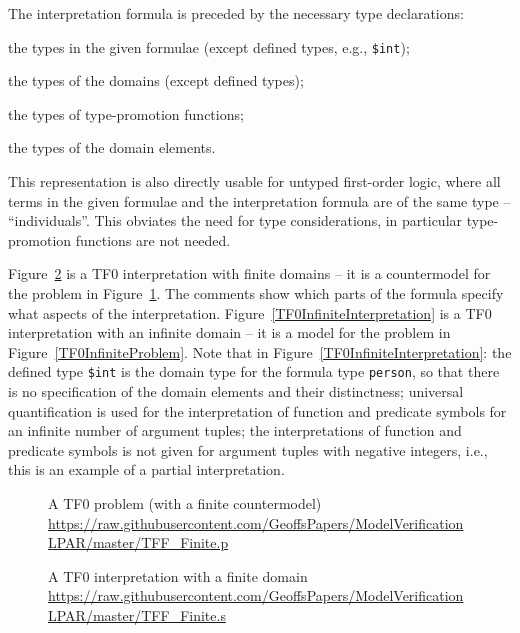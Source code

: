 \documentclass{easychair}
\newcommand{\smalltt}[1]{\small \texttt{#1}}
\newenvironment{packed_itemize}{
\vspace*{-0.2em}
\begin{itemize}
\setlength{\partopsep}{0pt}
\setlength{\itemsep}{1pt}
\setlength{\parskip}{0pt}
\setlength{\parsep}{0pt}
}{\end{itemize}}
\begin{document}
The interpretation formula is preceded by the necessary type declarations:
\begin{packed_itemize}
\item the types in the given formulae (except defined types, e.g., {\smalltt{\$int}});
\item the types of the domains (except defined types);
\item the types of type-promotion functions;
\item the types of the domain elements.
\end{packed_itemize}
This representation is also directly usable for untyped first-order logic, where all terms in 
the given formulae and the interpretation formula are of the same type – ``individuals''. 
This obviates the need for type considerations, in particular type-promotion functions are not 
needed.

Figure~\ref{TF0FiniteInterpretation} is a TF0 interpretation with finite domains -- it is a 
countermodel for the problem in Figure~\ref{TF0FiniteProblem}.
The comments show which parts of the formula specify what aspects of the interpretation.
Figure~\ref{TF0InfiniteInterpretation} is a TF0 interpretation with an infinite domain -- it 
is a model for the problem in Figure~\ref{TF0InfiniteProblem}.
Note that in Figure~\ref{TF0InfiniteInterpretation}:
the defined type {\smalltt{\$int}} is the domain type for the formula type 
{\smalltt{person}}, so that there is no specification of the domain elements and their 
distinctness;
universal quantification is used for the interpretation of function and predicate
symbols for an infinite number of argument tuples;
the interpretations of function and predicate symbols is not given for argument 
tuples with negative integers, i.e., this is an example of a partial interpretation.

\begin{figure}[htbp]
\small
{}

\caption{A TF0 problem (with a finite countermodel)\\
{\footnotesize \url{https://raw.githubusercontent.com/GeoffsPapers/ModelVerificationLPAR/master/TFF_Finite.p}}}
\label{TF0FiniteProblem}
\end{figure}

\begin{figure}[htbp]
\small
{}

\caption{A TF0 interpretation with a finite domain \\
{\footnotesize \url{https://raw.githubusercontent.com/GeoffsPapers/ModelVerificationLPAR/master/TFF_Finite.s}}}
\label{TF0FiniteInterpretation}
\end{figure}
\end{document}

